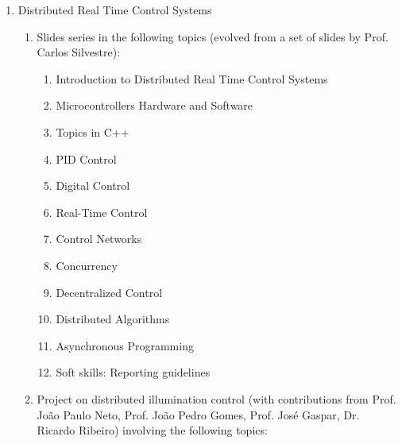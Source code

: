 \begin{enumerate}
\def\labelenumi{\arabic{enumi}.}
\item
  Distributed Real Time Control Systems

  \begin{enumerate}
  \def\labelenumii{\alph{enumii}.}
  \item
    Slides series in the following topics (evolved from a set of slides
    by Prof. Carlos Silvestre):

    \begin{enumerate}
    \def\labelenumiii{\roman{enumiii}.}
    \item
      Introduction to Distributed Real Time Control Systems
    \item
      Microcontrollers Hardware and Software
    \item
      Topics in C++
    \item
      PID Control
    \item
      Digital Control
    \item
      Real-Time Control
    \item
      Control Networks
    \item
      Concurrency
    \item
      Decentralized Control
    \item
      Distributed Algorithms
    \item
      Asynchronous Programming
    \item
      Soft skills: Reporting guidelines
    \end{enumerate}
  \item
    Project on distributed illumination control (with contributions from
    Prof. João Paulo Neto, Prof. João Pedro Gomes, Prof. José Gaspar,
    Dr. Ricardo Ribeiro) involving the following topics:


\end{enumerate}
\end{enumerate}
